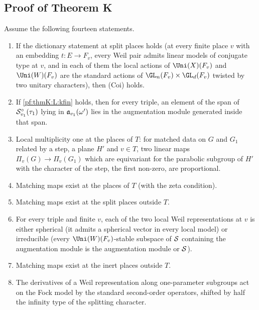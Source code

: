 \subsection{Proof of Theorem K}\label{sec:pf:thmK:final}

\begin{theorem}\label{pf:thmK:closesph}
Assume the following fourteen statements.
\begin{enumerate}[label=(H\arabic*),leftmargin=*]
\item\label{pf:thmK:H:dict} If the dictionary statement at split places holds (at every finite place $v$ with an embedding
$t\colon E\to F_v$, every Weil pair admits linear models of conjugate type at $v$, and in each of them the local actions of
$\Uni(X)(F_v)$ and $\Uni(W)(F_v)$ are the standard actions of $\GL_n(F_v)\times\GL_d(F_v)$ twisted by two unitary
characters), then \textup{(Coi)} holds.
\item\label{pf:thmK:H:so} If \ref{pf:thmK:L:kfin} holds, then for every triple, an element of the span of
$\mathcal{S}^{\circ}_{v_1}(\tau_1)$ lying in $\mathfrak{a}_{v_1}(\omega')$ lies in the augmentation module generated inside that span.
\item\label{pf:thmK:H:ram} Local multiplicity one at the places of $T$: for matched data on $G$ and $G_1$ related by a step, a
plane $H'$ and $v\in T$, two linear maps $\Pi_v(G)\to\Pi_v(G_1)$ which are equivariant for the parabolic subgroup of $H'$ with
the character of the step, the first non-zero, are proportional.
\item\label{pf:thmK:H:finram} Matching maps exist at the places of $T$ (with the zeta condition).
\item\label{pf:thmK:H:finsplit} Matching maps exist at the split places outside $T$.
\item\label{pf:thmK:H:sph} For every triple and finite $v$, each of the two local Weil representations at $v$ is either
spherical (it admits a spherical vector in every local model) or irreducible (every $\Uni(W)(F_v)$-stable subspace of $\mathcal{S}$
containing the augmentation module is the augmentation module or $\mathcal{S}$).
\item\label{pf:thmK:H:fininert} Matching maps exist at the inert places outside $T$.
\item\label{pf:thmK:H:lie2} The derivatives of a Weil representation along one-parameter subgroups act on the Fock model
by the standard second-order operators, shifted by half the infinity type of the splitting character.

\end{enumerate}
\end{theorem}
